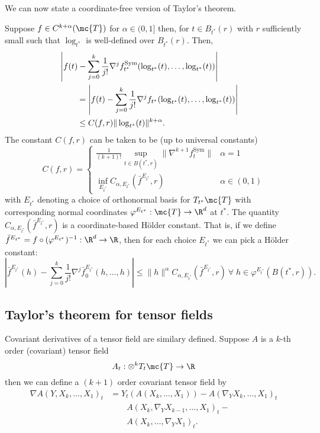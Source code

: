 \documentclass{article}
\begin{document}
We can now state a coordinate-free version of Taylor's theorem.
\begin{theorem}
\label{thm:taylor}
  Suppose $f \in C^{k+\alpha}(\mc{T})$ for $\alpha \in (0, 1]$ then, for $t \in B_{t^*}(r)$ with $r$ sufficiently small such that $\log_{t^*}$ is well-defined
    over $B_{t^*}(r)$. Then,
  \begin{equation}
    \label{eq:taylor:theorem}
\begin{aligned}
  \lefteqn{    \left|f(t) - \sum_{j=0}^k \frac{1}{j!} \nabla^j f^{\mathrm{Sym}}_{t^*}(\log_{t^*}(t), \dots, \log_{t^*}(t)) \right| } \\
  & \qquad =     \left|f(t) - \sum_{j=0}^k \frac{1}{j!} \nabla^j f_{t^*}(\log_{t^*}(t), \dots, \log_{t^*}(t)) \right| \\
  & \qquad \leq C(f,r) \|\log_{t^*}(t)\|^{k+\alpha}.
\end{aligned}
    \end{equation}
The constant $C(f, r)$ can be taken to be (up to universal constants)
\begin{equation}
  C(f,r) = \begin{cases} \frac{1}{(k+1)!}\sup_{t \in B(t^*,r)} \|\nabla^{k+1} f^{\mathrm{Sym}}_t\| & \alpha=1 \\
    \inf_{E_{t^*}}  C_{\alpha,E_{t^*}}(\bar{f}^{E_{t^*}}, r) & \alpha \in (0, 1)
\end{cases}
\end{equation}
  with $E_{t^*}$ denoting a choice of orthonormal basis for $T_{t^*}\mc{T}$ with corresponding
  normal coordinates $\varphi^{E_{t^*}}:\mc{T} \rightarrow \R^d$ at $t^*$. The quantity $C_{\alpha,E_{t^*}}(\bar{f}^{E_{t^*}}, r)$ is a coordinate-based H\"older constant.
  That is, if we define $\bar{f}^{E_{t^*}} = f\circ (\varphi^{E_{t^*}})^{-1}: \R^d \rightarrow \R$, then for each choice $E_{t^*}$ we can pick a H\"older constant:
  $$
\left| \bar{f}^{E_{t^*}}(h) - \sum_{j=0}^k \frac{1}{j!} \nabla^j \bar{f}^{E_{t^*}}_0(h, \dots, h) \right| \leq \|h\|^{\alpha} C_{\alpha, E_{t^*}}(\bar{f}^{E_{t^*}}, r) \ \forall \; h \in \varphi^{E_{t^*}}(B(t^*,r)).
  $$
  \end{theorem}

\subsection{Taylor's theorem for tensor fields}

Covariant derivatives of a tensor field are similary defined. Suppose $A$ is a $k$-th order (covariant) tensor field
$$
A_t:\otimes^k T_t\mc{T} \to \R
$$
then we can define a $(k+1)$ order covariant tensor field by
$$
\begin{aligned}
  \nabla A(Y, X_k, \dots, X_1)_t &= Y_{t}(A(X_k, \dots, X_1)) - A(\nabla_{Y}X_k, \dots, X_1)_t  \\
  &  \qquad  A(X_{k}, \nabla_{Y}X_{k-1}, \dots, X_1)_t - \\
  & \qquad A(X_{k}, \dots, \nabla_{Y}X_1)_t.
\end{aligned}
$$
\end{document}

